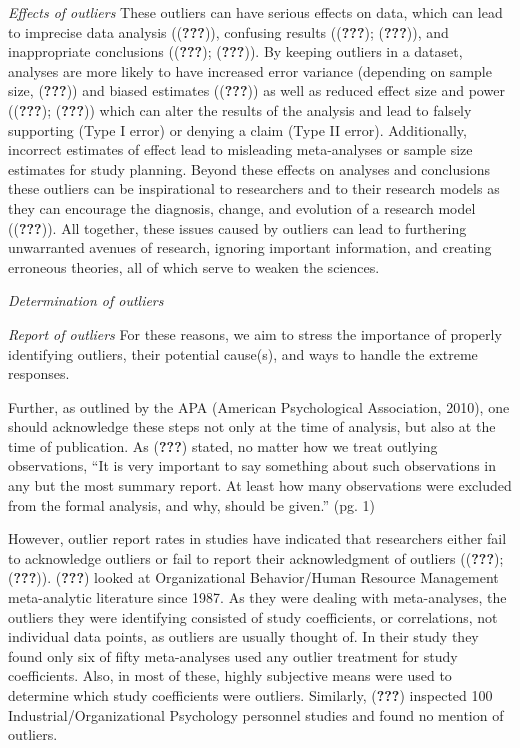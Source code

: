 \documentclass[english,man]{apa6}
\theoremstyle{definition}
\theoremstyle{definition}
\theoremstyle{definition}
\theoremstyle{remark}
\begin{document}
\emph{Effects of outliers} These outliers can have serious effects on
data, which can lead to imprecise data analysis (({\textbf{???}})),
confusing results (({\textbf{???}}); ({\textbf{???}})), and
inappropriate conclusions (({\textbf{???}}); ({\textbf{???}})). By
keeping outliers in a dataset, analyses are more likely to have
increased error variance (depending on sample size, ({\textbf{???}}))
and biased estimates (({\textbf{???}})) as well as reduced effect size
and power (({\textbf{???}}); ({\textbf{???}})) which can alter the
results of the analysis and lead to falsely supporting (Type I error) or
denying a claim (Type II error). Additionally, incorrect estimates of
effect lead to misleading meta-analyses or sample size estimates for
study planning. Beyond these effects on analyses and conclusions these
outliers can be inspirational to researchers and to their research
models as they can encourage the diagnosis, change, and evolution of a
research model (({\textbf{???}})). All together, these issues caused by
outliers can lead to furthering unwarranted avenues of research,
ignoring important information, and creating erroneous theories, all of
which serve to weaken the sciences.

\emph{Determination of outliers}

\emph{Report of outliers} For these reasons, we aim to stress the
importance of properly identifying outliers, their potential cause(s),
and ways to handle the extreme responses.

Further, as outlined by the APA (American Psychological Association,
2010), one should acknowledge these steps not only at the time of
analysis, but also at the time of publication. As ({\textbf{???}})
stated, no matter how we treat outlying observations, \enquote{It is
very important to say something about such observations in any but the
most summary report. At least how many observations were excluded from
the formal analysis, and why, should be given.} (pg. 1)

However, outlier report rates in studies have indicated that researchers
either fail to acknowledge outliers or fail to report their
acknowledgment of outliers (({\textbf{???}}); ({\textbf{???}})).
({\textbf{???}}) looked at Organizational Behavior/Human Resource
Management meta-analytic literature since 1987. As they were dealing
with meta-analyses, the outliers they were identifying consisted of
study coefficients, or correlations, not individual data points, as
outliers are usually thought of. In their study they found only six of
fifty meta-analyses used any outlier treatment for study coefficients.
Also, in most of these, highly subjective means were used to determine
which study coefficients were outliers. Similarly, ({\textbf{???}})
inspected 100 Industrial/Organizational Psychology personnel studies and
found no mention of outliers.
\end{document}
